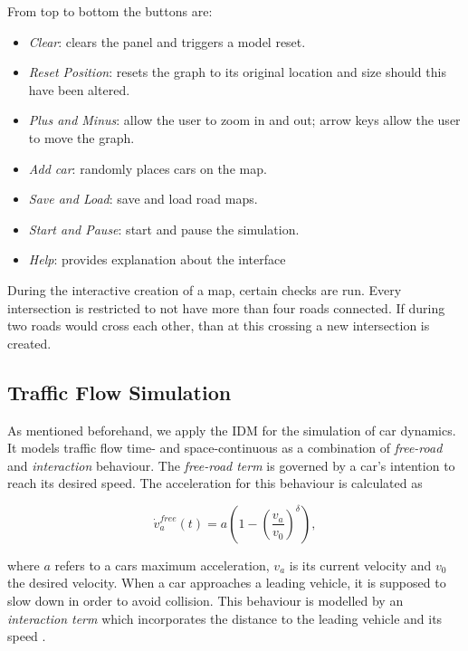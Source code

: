 \documentclass[10pt]{article}
\begin{document}
From top to bottom the buttons are:
\begin{itemize}
	\setlength\itemsep{0.2em}
	\item \textit{Clear}: clears the panel and triggers a model reset.
	\item \textit{Reset Position}: resets the graph to its original location and size should this have been altered.
	\item \textit{Plus and Minus}: allow the user to zoom in and out; arrow keys allow the user to move the graph.
	\item \textit{Add car}: randomly places cars on the map.
	\item \textit{Save and Load}: save and load road maps. 
	\item \textit{Start and Pause}: start and pause the simulation.
	\item \textit{Help}: provides explanation about the interface
\end{itemize}

During the interactive creation of a map, certain checks are run. Every intersection is restricted to not have more than four roads connected. If during two roads would cross each other, than at this crossing a new intersection is created.
	
\subsection{Traffic Flow Simulation}

As mentioned beforehand, we apply the IDM \citep{treiber2000congested} for the simulation of car dynamics. It models traffic flow time- and space-continuous as a combination of \textit{free-road} and \textit{interaction} behaviour. The \textit{free-road term} is governed by a car's intention to reach its desired speed. The acceleration for this behaviour is calculated \citep{treiber2000congested} as

\begin{equation}
	\label{eq:free-road-term}
	\dot{v}_a^{free}(t) = a ( 1 - ( \frac{v_a}{v_0} )^\delta),
\end{equation}

where $a$ refers to a cars maximum acceleration, $v_a$ is its current velocity and $v_0$ the desired velocity. When a car approaches a leading vehicle, it is supposed to slow down in order to avoid collision. This behaviour is modelled by an \textit{interaction term} which incorporates the distance to the leading vehicle and its speed \citep{treiber2000congested}. 
\end{document}
